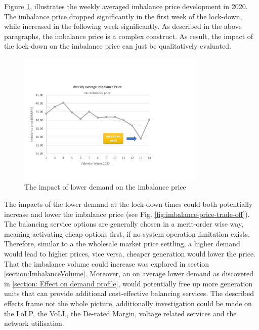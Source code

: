 \documentclass[energies,article,submit,moreauthors,pdftex]{Definitions/mdpi}
\begin{document}
Figure \ref{fig:imbalance-price-development}, illustrates the weekly averaged imbalance price development in 2020. The imbalance price dropped significantly in the first week of the lock-down, while increased in the following week significantly. As described in the above paragraphs, the imbalance price is a complex construct. As result, the impact of the lock-down on the imbalance price can just be qualitatively evaluated.

\begin{figure}[H]
\centering
\hspace{-25pt}
\includegraphics[trim={0cm 2cm 7cm 4.5cm},clip,width=0.8\textwidth]{Graphics/Imbalance-price-development-2020.pdf}
\caption{The impact of lower demand on the imbalance price}
\label{fig:imbalance-price-development}
\end{figure} 

The impacts of the lower demand at the lock-down times could both potentially increase and lower the imbalance price (see Fig. \ref{fig:imbalance-price-trade-off}). The balancing service options are generally chosen in a merit-order wise way, meaning activating cheap options first, if no system operation limitation exists. Therefore, similar to a the wholesale market price settling, a higher demand would lead to higher prices, vice versa, cheaper generation would lower the price. That the imbalance volume could increase was explored in section \ref{section:ImbalanceVolume}. Moreover, an on average lower demand as discovered in \ref{section: Effect on demand profile}, would potentially free up more generation units that can provide additional cost-effective balancing services. The described effects frame not the whole picture, additionally investigation could be made on the LoLP, the VoLL, the De-rated Margin, voltage related services and the network utilisation.
\end{document}
